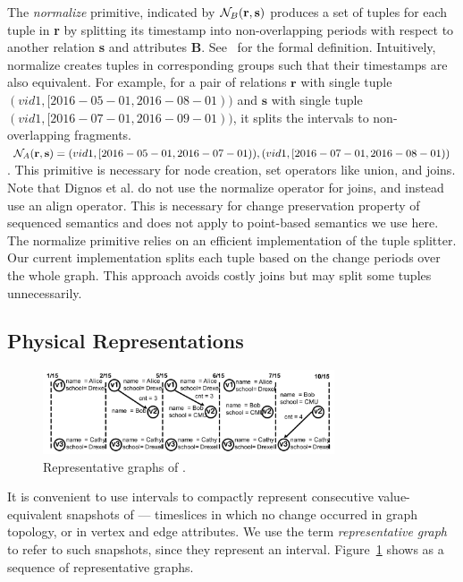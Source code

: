 The {\em normalize} primitive, indicated by $\mathcal{N}_{B}(\mathbf{r},\mathbf{s})$ produces
a set of tuples for each tuple in {\bf r} by splitting its timestamp
into non-overlapping periods with respect to another relation {\bf s}
and attributes {\bf B}.  See~\cite{Dignos2012} for the formal
definition.  Intuitively, normalize creates tuples in corresponding
groups such that their timestamps are also equivalent.  For example,
for a pair of relations $\mathbf{r}$ with single tuple $(vid1,
[2016-05-01, 2016-08-01))$ and $\mathbf{s}$ with single tuple $(vid1,
  [2016-07-01, 2016-09-01))$, it splits the intervals to
    non-overlapping fragments. $\mathcal{N}_{A}(\mathbf{r},\mathbf{s}) = (vid1, [2016-05-01,
      2016-07-01)),(vid1, [2016-07-01, 2016-08-01))$.  This primitive
        is necessary for node creation, set operators like union, and
        joins.  Note that Dignos et al. do not use the normalize
        operator for joins, and instead use an align operator.  This
        is necessary for change preservation property of sequenced
        semantics and does not apply to point-based semantics we use
        here.  The normalize primitive relies on an efficient
        implementation of the tuple splitter.  Our current
        implementation splits each tuple based on the change periods
        over the whole graph.  This approach avoids costly joins but
        may split some tuples unnecessarily.

\subsection{Physical Representations}
\label{sec:sys:datastructs}

\begin{figure}[t!]
\centering
\includegraphics[width=3.4in]{figs/T1_graphs.pdf}
\caption{Representative graphs of \tg {}.}
\label{fig:tg_rg}
\end{figure}

It is convenient to use intervals to compactly represent consecutive
value-equivalent snapshots of \tve --- timeslices in which no change
occurred in graph topology, or in vertex and edge attributes.  We use
the term {\em representative graph} to refer to such snapshots, since
they represent an interval.  Figure~\ref{fig:tg_rg} shows 
as a sequence of representative graphs.


